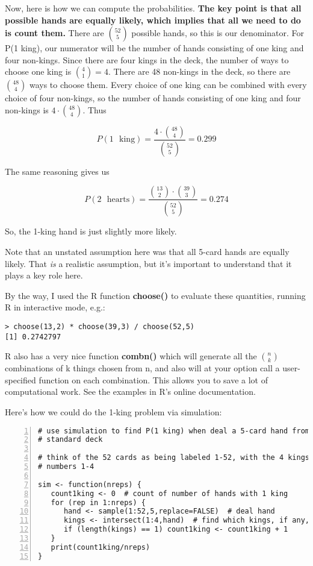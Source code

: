Now, here is how we can compute the probabilities.  {\bf The key point is
that all possible hands are equally likely, which implies that all we
need to do is count them.}  There are $\binom{52}{5}$ possible hands, so
this is our denominator.  For P(1 king), our numerator will be the
number of hands consisting of one king and four non-kings.  Since there
are four kings in the deck, the number of ways to choose one king is
$\binom{4}{1} = 4$.  There are 48 non-kings in the deck, so there are
$\binom{48}{4}$ ways to choose them.  Every choice of one king can be
combined with every choice of four non-kings, so the number of hands
consisting of one king and four non-kings is $4 \cdot \binom{48}{4}$.
Thus

\begin{equation}
P(1 \textrm{~ king}) = \frac{4 \cdot \binom{48}{4}}{\binom{52}{5}} = 0.299
\end{equation}

The same reasoning gives us

\begin{equation}
P(2 \textrm{~ hearts}) = \frac{\binom{13}{2} \cdot \binom{39}{3}}{\binom{52}{5}} = 0.274
\end{equation}

So, the 1-king hand is just slightly more likely.

Note that an unstated assumption here was that all 5-card hands are
equally likely.  That {\it is} a realistic assumption, but it's
important to understand that it plays a key role here.

By the way, I used the R function {\bf choose()} to evaluate these
quantities, running R in interactive mode, e.g.:

\begin{Verbatim}[fontsize=\relsize{-2}]
> choose(13,2) * choose(39,3) / choose(52,5)
[1] 0.2742797
\end{Verbatim}

R also has a very nice function {\bf combn()} which will generate all
the $\binom{n}{k}$ combinations of k things chosen from n, and also will
at your option call a user-specified function on each combination.  This
allows you to save a lot of computational work.  See the examples in R's
online documentation.

Here's how we could do the 1-king problem via simulation:

\begin{Verbatim}[fontsize=\relsize{-2},numbers=left]
# use simulation to find P(1 king) when deal a 5-card hand from a
# standard deck

# think of the 52 cards as being labeled 1-52, with the 4 kings having
# numbers 1-4

sim <- function(nreps) {
   count1king <- 0  # count of number of hands with 1 king
   for (rep in 1:nreps) {
      hand <- sample(1:52,5,replace=FALSE)  # deal hand
      kings <- intersect(1:4,hand)  # find which kings, if any, are in hand
      if (length(kings) == 1) count1king <- count1king + 1
   }
   print(count1king/nreps)
}
\end{Verbatim}

